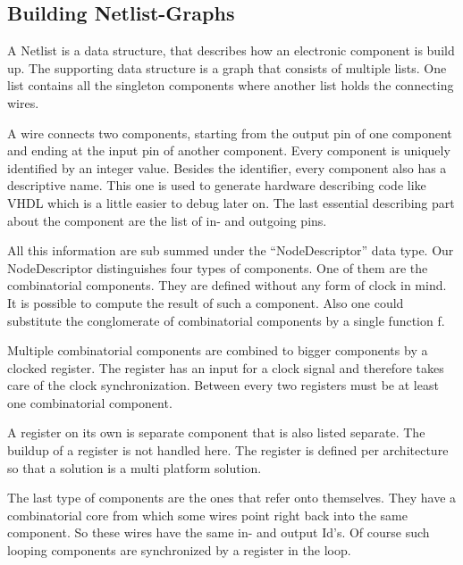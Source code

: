 \documentclass[11pt,final,a4paper]{article}
\begin{document}


\subsection{Building Netlist-Graphs}
A Netlist is a data structure, that describes how an electronic component is build up. The supporting data structure is a graph
that consists of multiple lists. One list contains all the singleton components where another list holds the connecting wires. 

A wire connects two components, starting from the output pin of one component and ending at the input pin of another
component. Every component is uniquely identified by an integer value. Besides the identifier, every component also has a
descriptive name. This one is used to generate hardware describing code like VHDL which is a little easier to debug later on. The
last essential describing part about the component are the list of in- and outgoing pins. 

All this information are sub summed under the ``NodeDescriptor'' data type. Our NodeDescriptor distinguishes four types of
components. One of them are the combinatorial components. They are defined without any form of clock in mind. It is possible to
compute the result of such a component. Also one could substitute the conglomerate of combinatorial components by a single
function f. 

Multiple combinatorial components are combined to bigger components by a clocked register. The register has an input for a clock
signal and therefore takes care of the clock synchronization. Between every two registers must be at least one combinatorial
component.

A register on its own is separate component that is also listed separate. The buildup of a register is not handled here. The
register is defined per architecture so that a solution is a multi platform solution.

The last type of components are the ones that refer onto themselves. They have a combinatorial core from which some wires point
right back into the same component. So these wires have the same in- and output Id's. Of course such looping components are
synchronized by a register in the loop.
\end{document}
